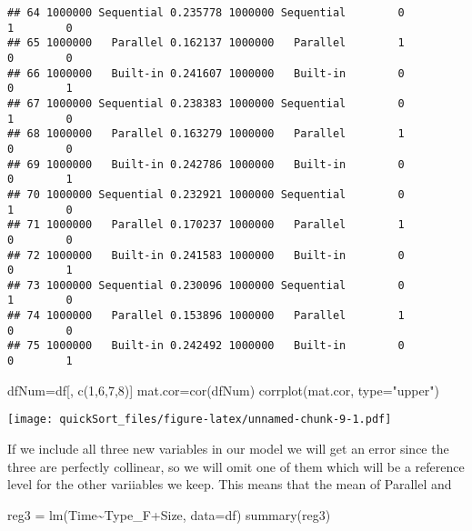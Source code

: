 \documentclass[
]{article}
\newenvironment{Shaded}{\begin{snugshade}}{\end{snugshade}}
\newcommand{\AttributeTok}[1]{\textcolor[rgb]{0.77,0.63,0.00}{#1}}
\newcommand{\DecValTok}[1]{\textcolor[rgb]{0.00,0.00,0.81}{#1}}
\newcommand{\FunctionTok}[1]{\textcolor[rgb]{0.00,0.00,0.00}{#1}}
\newcommand{\NormalTok}[1]{#1}
\newcommand{\OtherTok}[1]{\textcolor[rgb]{0.56,0.35,0.01}{#1}}
\newcommand{\SpecialCharTok}[1]{\textcolor[rgb]{0.00,0.00,0.00}{#1}}
\newcommand{\StringTok}[1]{\textcolor[rgb]{0.31,0.60,0.02}{#1}}
\begin{document}
\begin{verbatim}
## 64 1000000 Sequential 0.235778 1000000 Sequential        0          1        0
## 65 1000000   Parallel 0.162137 1000000   Parallel        1          0        0
## 66 1000000   Built-in 0.241607 1000000   Built-in        0          0        1
## 67 1000000 Sequential 0.238383 1000000 Sequential        0          1        0
## 68 1000000   Parallel 0.163279 1000000   Parallel        1          0        0
## 69 1000000   Built-in 0.242786 1000000   Built-in        0          0        1
## 70 1000000 Sequential 0.232921 1000000 Sequential        0          1        0
## 71 1000000   Parallel 0.170237 1000000   Parallel        1          0        0
## 72 1000000   Built-in 0.241583 1000000   Built-in        0          0        1
## 73 1000000 Sequential 0.230096 1000000 Sequential        0          1        0
## 74 1000000   Parallel 0.153896 1000000   Parallel        1          0        0
## 75 1000000   Built-in 0.242492 1000000   Built-in        0          0        1
\end{verbatim}

\begin{Shaded}
\begin{Highlighting}[]
\NormalTok{dfNum}\OtherTok{=}\NormalTok{df[, }\FunctionTok{c}\NormalTok{(}\DecValTok{1}\NormalTok{,}\DecValTok{6}\NormalTok{,}\DecValTok{7}\NormalTok{,}\DecValTok{8}\NormalTok{)]}
\NormalTok{mat.cor}\OtherTok{=}\FunctionTok{cor}\NormalTok{(dfNum)}
\FunctionTok{corrplot}\NormalTok{(mat.cor, }\AttributeTok{type=}\StringTok{"upper"}\NormalTok{)}
\end{Highlighting}
\end{Shaded}

\texttt{[image: quickSort\_files/figure-latex/unnamed-chunk-9-1.pdf]}

If we include all three new variables in our model we will get an error
since the three are perfectly collinear, so we will omit one of them
which will be a reference level for the other variiables we keep. This
means that the mean of Parallel and

\begin{Shaded}
\begin{Highlighting}[]
\NormalTok{reg3 }\OtherTok{=} \FunctionTok{lm}\NormalTok{(Time}\SpecialCharTok{\textasciitilde{}}\NormalTok{Type\_F}\SpecialCharTok{+}\NormalTok{Size, }\AttributeTok{data=}\NormalTok{df)}
\FunctionTok{summary}\NormalTok{(reg3)}
\end{Highlighting}
\end{Shaded}
\end{document}
